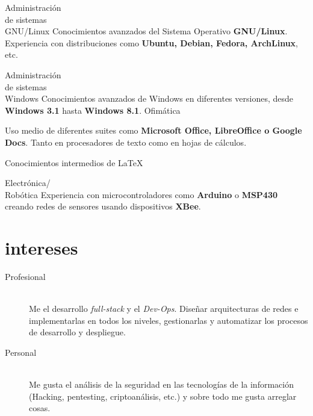 \documentclass[hidelinks]{friggeri-cv} %
\begin{document}
\begin{entrylist}

\entry
{Administración \\ de sistemas \\ GNU/Linux}
{}
{}
{Conocimientos avanzados del Sistema Operativo \textbf{GNU/Linux}. Experiencia con
distribuciones como \textbf{Ubuntu, Debian, Fedora, ArchLinux}, etc.}

\entry
{Administración \\ de sistemas \\ Windows}
{}
{}
{Conocimientos avanzados de Windows en diferentes versiones, desde \textbf{Windows 3.1} hasta \textbf{Windows 8.1}.}
\entry
{Ofimática}
{}
{}
{Uso medio de diferentes suites como \textbf{Microsoft Office, LibreOffice o Google Docs}.
Tanto en procesadores de texto como en hojas de cálculos.

Conocimientos intermedios de \LaTeX}

\entry
{Electrónica/ \\ Robótica}
{}
{}
{Experiencia con microcontroladores como \textbf{Arduino} o \textbf{MSP430} creando redes de sensores usando dispositivos \textbf{XBee}.}
\end{entrylist}



\section{intereses}

\begin{description}
  \item[Profesional] \hfill \\
Me el desarrollo \emph{full-stack} y el \emph{Dev-Ops}. Diseñar arquitecturas de redes e implementarlas en todos los niveles, gestionarlas y
automatizar los procesos de desarrollo y despliegue.

\item[Personal] \hfill \\
Me gusta el análisis de la seguridad en las tecnologías de la información
(Hacking, pentesting, criptoanálisis, etc.) y sobre todo me gusta arreglar cosas.
\end{description}

\end{document}
